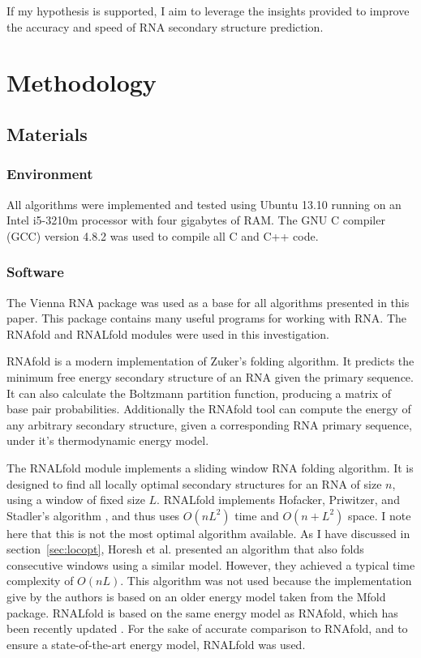 \documentclass{cshonours}
\begin{document}
If my hypothesis is supported, I aim to leverage the insights provided to improve the accuracy and speed of RNA secondary structure prediction.

\chapter{Methodology}

\section{Materials}
\subsection{Environment}
All algorithms were implemented and tested using Ubuntu 13.10 running on an Intel i5-3210m processor with four gigabytes of RAM. The GNU C compiler (GCC) version 4.8.2 was used to compile all C and C++ code. 

\subsection{Software}
The Vienna RNA package was used as a base for all algorithms presented in this paper. This package contains many useful programs for working with RNA. The RNAfold and RNALfold modules were used in this investigation. 

RNAfold is a modern implementation of Zuker's folding algorithm. It predicts the minimum free energy secondary structure of an RNA given the primary sequence. It can also calculate the Boltzmann partition function, producing a matrix of base pair probabilities. Additionally the RNAfold tool can compute the energy of any arbitrary secondary structure, given a corresponding RNA primary sequence, under it's thermodynamic energy model.

The RNALfold module implements a sliding window RNA folding algorithm. It is designed to find all locally optimal secondary structures for an RNA of size $n$, using a window of fixed size $L$. RNALfold implements Hofacker, Priwitzer, and Stadler's algorithm \cite{hofacker2004prediction}, and thus uses $O(nL^2)$ time and $O(n + L^2)$ space. I note here that this is not the most optimal algorithm available. As I have discussed in section~\ref{sec:locopt}, Horesh et al. \cite{horesh2009rnaslider} presented an algorithm that also folds consecutive windows using a similar model. However, they achieved a typical time complexity of $O(nL)$. This algorithm was not used because the implementation give by the authors is based on an older energy model taken from the Mfold package. RNALfold is based on the same energy model as RNAfold, which has been recently updated \cite{lorenz2011viennarna}. For the sake of accurate comparison to RNAfold, and to ensure a state-of-the-art energy model, RNALfold was used.
\end{document}
